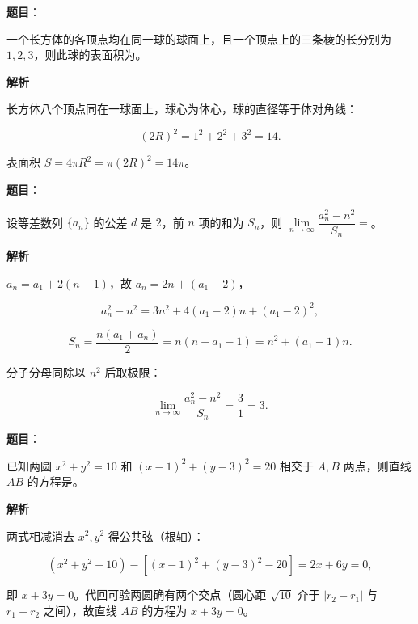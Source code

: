 \begin{answer}

\textbf{题目}：

一个长方体的各顶点均在同一球的球面上，且一个顶点上的三条棱的长分别为 $1,2,3$，则此球的表面积为\gkblank{}。

\textbf{解析}

长方体八个顶点同在一球面上，球心为体心，球的直径等于体对角线：

\nopagebreak[4]
\[(2R)^2=1^2+2^2+3^2=14 .\]

表面积 $S=4\pi R^2=\pi(2R)^2=14\pi$。


\end{answer}
\begin{answer}

\textbf{题目}：

设等差数列 $\{a_n\}$ 的公差 $d$ 是 $2$，前 $n$ 项的和为 $S_n$，则 $\lim\limits_{n\to\infty}\dfrac{a_n^2-n^2}{S_n}=$\gkblank{}。

\textbf{解析}

$a_n=a_1+2(n-1)$，故 $a_n=2n+(a_1-2)$，

\nopagebreak[4]
\[a_n^2-n^2=3n^2+4(a_1-2)n+(a_1-2)^2 ,\]

\nopagebreak[4]
\[S_n=\frac{n\left(a_1+a_n\right)}2=n\left(n+a_1-1\right)=n^2+(a_1-1)n .\]

分子分母同除以 $n^2$ 后取极限：

\nopagebreak[4]
\[\lim_{n\to\infty}\frac{a_n^2-n^2}{S_n}=\frac31=3 .\]


\end{answer}
\begin{answer}

\textbf{题目}：

已知两圆 $x^2+y^2=10$ 和 $(x-1)^2+(y-3)^2=20$ 相交于 $A,B$ 两点，则直线 $AB$ 的方程是\gkblank{}。

\textbf{解析}

两式相减消去 $x^2,y^2$ 得公共弦（根轴）：

\nopagebreak[4]
\[\left(x^2+y^2-10\right)-\left[(x-1)^2+(y-3)^2-20\right]=2x+6y=0,\]

即 $x+3y=0$。代回可验两圆确有两个交点（圆心距 $\sqrt{10}$ 介于 $|r_2-r_1|$ 与 $r_1+r_2$ 之间），故直线 $AB$ 的方程为 $x+3y=0$。


\end{answer}
